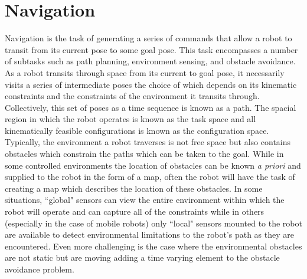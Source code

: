 
\chapter{Navigation} \label{ch:navigation}

Navigation is the task of generating a series of commands that allow a robot to transit from its current pose
to some goal pose. This task encompasses a number of subtasks such as path planning, environment sensing, and obstacle
avoidance. As a robot transits through space from its current to goal pose, it necessarily visits a series
of intermediate poses the choice of which depends on its kinematic constraints and the constraints of the environment it transits through. 
Collectively, this set of poses as a time sequence is known as a path. 
The spacial region in which the robot operates is known as the task space and all kinematically feasible configurations is known as the
configuration space.  Typically, the environment a robot traverses is not free space but also contains obstacles 
which constrain the paths which can be taken to the goal. While in some 
controlled environments the location of obstacles can be known \textit{a priori} and supplied to the robot in the form of a map, often the
robot will have the task of creating a map which describes the location of these obstacles. In some situations, ``global" 
sensors can view the entire environment within which the robot will operate and can capture all of the constraints while in others (especially
in the case of mobile robots) only ``local" sensors mounted to the robot are available to detect environmental limitations
to the robot's path as they are encountered. Even more challenging is the case where the environmental obstacles are not
static but are moving adding a time varying element to the obstacle avoidance problem.


